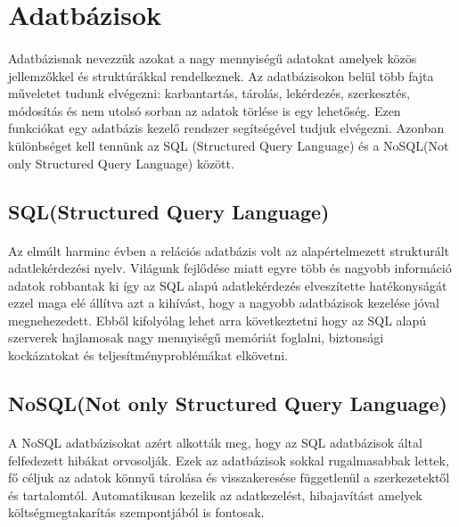 	\section{Adatbázisok}
	\paragraph{}
	Adatbázisnak nevezzük azokat a nagy mennyiségű adatokat amelyek közös jellemzőkkel és struktúrákkal rendelkeznek. Az adatbázisokon belül több fajta műveletet tudunk elvégezni: karbantartás, tárolás, lekérdezés, szerkesztés, módosítás és nem utolsó sorban az adatok törlése is egy lehetőség. Ezen funkciókat egy adatbázis kezelő rendszer segítségével tudjuk elvégezni.\cite{dbms} Azonban különbséget kell tennünk az SQL (Structured Query Language) és a NoSQL(Not only Structured Query Language) között.
	\subsection{SQL(Structured Query Language)}
	\paragraph{}
	Az elmúlt harminc évben a relációs adatbázis volt az alapértelmezett strukturált adatlekérdezési nyelv. Világunk fejlődése miatt egyre több és nagyobb információ adatok robbantak ki így az SQL alapú adatlekérdezés elveszítette hatékonyságát ezzel maga elé állítva azt a kihívást, hogy a nagyobb adatbázisok kezelése jóval megnehezedett. Ebből kifolyólag lehet arra következtetni hogy az SQL alapú szerverek hajlamosak nagy mennyiségű memóriát foglalni, biztonsági kockázatokat és teljesítményproblémákat elkövetni.\cite{venkatraman2016sql} 
	
	\subsection{NoSQL(Not only Structured Query Language)}
	\paragraph{}
	A NoSQL adatbázisokat azért alkották meg, hogy az SQL adatbázisok által felfedezett hibákat orvosolják. Ezek az adatbázisok sokkal rugalmasabbak lettek, fő céljuk az adatok könnyű tárolása és visszakeresése függetlenül a szerkezetektől és tartalomtól. Automatikusan kezelik az adatkezelést, hibajavítást amelyek költségmegtakarítás szempontjából is fontosak.\cite{venkatraman2016sql} 
	
